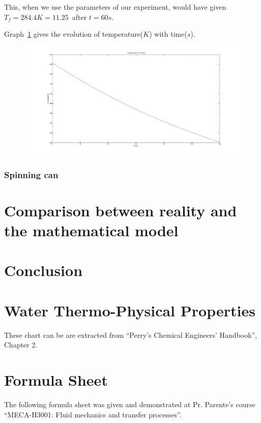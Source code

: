 \documentclass{report}
\begin{document}
	This, when we use the parameters of our experiment, would have given $T_f=284.4K=11.25$\textcelsius\ after $t=60s$.
	
	Graph~\ref{NSg} gives the evolution of temperature($K$) with time($s$).
	\begin{figure}
		\label{NSg}
		\centering
		\includegraphics[width=\textwidth]{img/NSg.jpg}
	\end{figure}
	
	\subsection{Spinning can}
	
	\chapter[Reality and mathematical model]{Comparison between reality and the mathematical model}\label{rvmm}
	
	\chapter{Conclusion}\label{ccl}
	
	
	\appendix
	
	\chapter{Water Thermo-Physical Properties}\label{WTPP}
	
	These chart can be are extracted from ``Perry’s	Chemical Engineers’ Handbook'', Chapter 2\cite{properties}.
	
	
	
	\chapter{Formula Sheet}\label{FORMU}
	
	The following formula sheet was given and demonstrated at Pr. Parente's course ``MECA-H3001: Fluid mechanics and transfer processes''.
	
	
	
	
	{}
	
	
\end{document}
